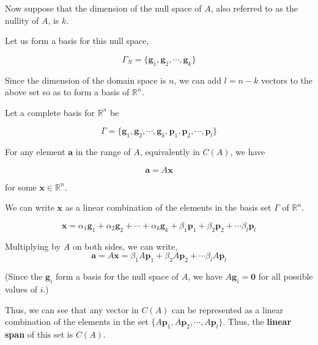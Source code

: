\documentclass[a4paper]{article}
\begin{document}
Now suppose that the dimension of the null space of $A$, also referred to as the nullity of $A$, is $k$.

Let us form a basis for this null space,

\begin{equation}
\mathit{\Gamma}_N = \{ \boldsymbol{g}_1, \boldsymbol{g}_2, \cdots, \boldsymbol{g}_k \} 
\end{equation}

Since the dimension of the domain space is $n$, we can add $l=n-k$ vectors to the above set so as to form a basis of $\mathbb{R}^{n}$.

Let a complete basis for $\mathbb{R}^n$ be

\begin{equation}
\mathit{\Gamma} = \{ \boldsymbol{g}_1, \boldsymbol{g}_2, \cdots, \boldsymbol{g}_k, \boldsymbol{p}_1, \boldsymbol{p}_2, \cdots, \boldsymbol{p}_l \} 
\end{equation}

For any element $\boldsymbol{a}$ in the range of $A$, equivalently in $C(A)$, we have

\begin{equation}
\boldsymbol{a} = A\boldsymbol{x}
\end{equation}

for some $\boldsymbol{x} \in \mathbb{R}^n$.

We can write $\boldsymbol{x}$ as a linear combination of the elements in the basis set $\Gamma$ of $\mathbb{R}^n$.

\begin{equation}
\boldsymbol{x} = \alpha_1 \boldsymbol{g}_1 + \alpha_2 \boldsymbol{g}_2+ \cdots + \alpha_k \boldsymbol{g}_k + \beta_1 \boldsymbol{p}_1 + \beta_2 \boldsymbol{p}_2 + \cdots \beta_l \boldsymbol{p}_l 
\end{equation}

Multiplying by $A$ on both sides, we can write,
\begin{equation}
\boldsymbol{a} = A\boldsymbol{x} = \beta_1 A\boldsymbol{p}_1 + \beta_2 A\boldsymbol{p}_2 + \cdots \beta_l A\boldsymbol{p}_l 
\end{equation}

(Since the $\boldsymbol{g}_i$ form a basis for the null space of $A$, we have $A\boldsymbol{g}_i = \boldsymbol{0}$ for all possible values of $i$.)

Thus, we can see that any vector in $C(A)$ can be represented as a linear combination of the elements in the set $\{A\boldsymbol{p}_1, A\boldsymbol{p}_2, \cdots, A\boldsymbol{p}_l \}$. Thus, the \textbf{linear span} of this set is $C(A)$.
\end{document}
